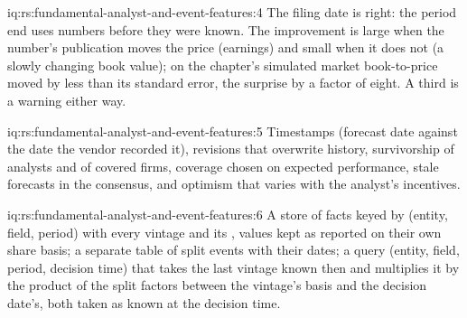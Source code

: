 \begin{solution}{iq:rs:fundamental-analyst-and-event-features:4}
The filing date is right: the period end uses numbers before they were known. The improvement is large when the number's publication moves the
price (earnings) and small when it does not (a slowly changing book value); on the chapter's simulated market book-to-price moved by less than its
standard error, the surprise by a factor of eight. A third is a warning either way.
\end{solution}

\begin{solution}{iq:rs:fundamental-analyst-and-event-features:5}
Timestamps (forecast date against the date the vendor recorded it), revisions that overwrite history, survivorship of analysts and of covered firms,
coverage chosen on expected performance, stale forecasts in the consensus, and optimism that varies with the analyst's incentives.
\end{solution}

\begin{solution}{iq:rs:fundamental-analyst-and-event-features:6}
A  store of facts keyed by (entity, field, period) with every vintage and its , values kept as reported on their own share
basis; a separate table of split events with their dates; a query (entity, field, period, decision time) that takes the last vintage known then and
multiplies it by the product of the split factors between the vintage's basis and the decision date's, both taken as known at the decision time.
\end{solution}
